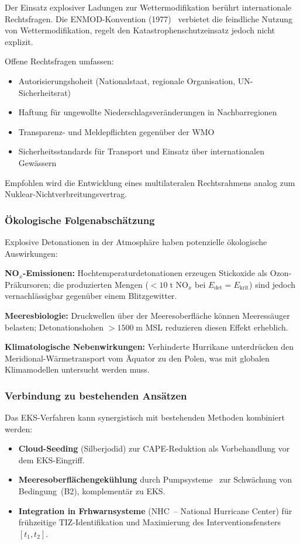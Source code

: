 ﻿\documentclass[a4paper,12pt]{article}
\theoremstyle{definition}
\begin{document}
Der Einsatz explosiver Ladungen zur Wettermodifikation ber\"{u}hrt
internationale Rechtsfragen.
Die ENMOD-Konvention (1977)~\cite{enmod1977} verbietet die
feindliche Nutzung von Wettermodifikation, regelt den
Katastrophenschutzeinsatz jedoch nicht explizit.

Offene Rechtsfragen umfassen:
\begin{itemize}
    \item Autorisierungshoheit (Nationalstaat, regionale Organisation,
          UN-Sicherheitsrat)
    \item Haftung f\"{u}r ungewollte Niederschlagsver\"{a}nderungen
          in Nachbarregionen
    \item Transparenz- und Meldepflichten gegen\"{u}ber der WMO
    \item Sicherheitsstandards f\"{u}r Transport und Einsatz
          \"{u}ber internationalen Gew\"{a}ssern
\end{itemize}
Empfohlen wird die Entwicklung eines multilateralen Rechtsrahmens
analog zum Nuklear-Nichtverbreitungsvertrag.

\subsubsection{\"{O}kologische Folgenabsch\"{a}tzung}

Explosive Detonationen in der Atmosph\"{a}re haben potenzielle
\"{o}kologische Auswirkungen:

\textbf{NO$_{x}$-Emissionen:} Hochtemperaturdetonationen erzeugen
Stickoxide als Ozon-Pr\"{a}kursoren;
die produzierten Mengen ($<10\;\mathrm{t}$ NO$_{x}$ bei
$E_{\mathrm{det}}=E_{\mathrm{krit}}$) sind jedoch vernachl\"{a}ssigbar
gegen\"{u}ber einem Blitzgewitter.

\textbf{Meeresbiologie:} Druckwellen \"{u}ber der Meeresoberfl\"{a}che
k\"{o}nnen Meeress\"{a}uger belasten;
Detonationshohen $>1500\;\mathrm{m}$ MSL reduzieren diesen Effekt
erheblich.

\textbf{Klimatologische Nebenwirkungen:} Verhinderte Hurrikane
unterdr\"{u}cken den Meridional-W\"{a}rmetransport vom
\"{A}quator zu den Polen, was mit globalen Klimamodellen untersucht
werden muss.

\subsubsection{Verbindung zu bestehenden Ans\"{a}tzen}

Das EKS-Verfahren kann synergistisch mit bestehenden Methoden
kombiniert werden:
\begin{itemize}
    \item \textbf{Cloud-Seeding} (Silberjodid) zur CAPE-Reduktion
          als Vorbehandlung vor dem EKS-Eingriff.
    \item \textbf{Meeresoberfl\"{a}chengek\"{u}hlung} durch Pumpsysteme~\cite{salter2008}
          zur Schw\"{a}chung von Bedingung~(B2), komplement\"{a}r zu EKS.
    \item \textbf{Integration in Frhwarnsysteme} (NHC~-- National Hurricane Center)
          f\"{u}r fr\"{u}hzeitige TIZ-Identifikation und Maximierung des
          Interventionsfensters $[t_{1},t_{2}]$.
\end{itemize}
\end{document}
